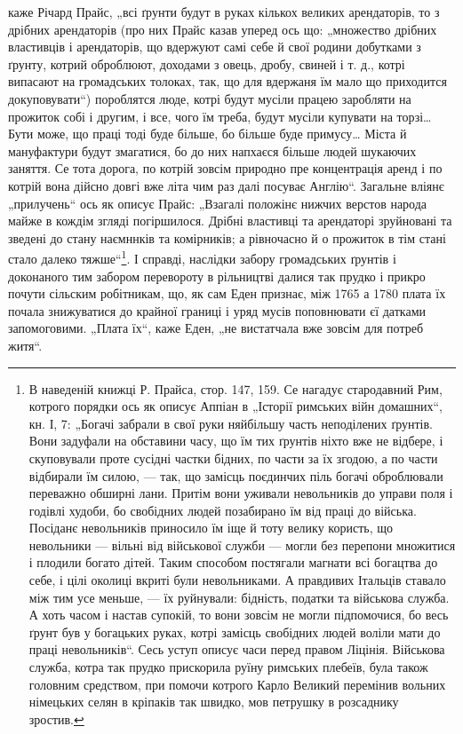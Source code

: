 \parcont{}
каже Річард Прайс, „всі ґрунти будут в руках кількох великих арендаторів, то з дрібних арендаторів (про них Прайс
казав уперед ось що: „множество дрібних властивців і арендаторів, що вдержуют самі себе й свої родини добутками з ґрунту, котрий оброблюют, доходами з овець, дробу, свиней і т. д.,
котрі випасают на громадських толоках, так, що для вдержаня їм мало що приходится докуповувати“)
пороблятся люде, котрі будут мусіли працею заробляти на прожиток собі і другим, і все, чого їм
треба, будут мусіли купувати на торзі\dots{} Бути може, що праці тоді буде більше, бо більше буде примусу\dots{} Міста й
мануфактури будут змагатися, бо до них напхаєся більше людей шукаючих заняття. Се тота дорога, по
котрій зовсім природно пре концентрація аренд і по котрій вона дійсно довгі вже літа чим раз далі
посуває Англію“. Загальне вліянє „прилучень“ ось як описує Прайс: „Взагалі положінє нижчих верстов
народа майже в кождім згляді погіршилося. Дрібні властивці та арендаторі зруйновані та зведені до
стану наємннків та комірників; а рівночасно й о прожиток в тім стані стало далеко тяжше“\footnote{
В наведеній книжці Р. Прайса, стор. 147, 159. Се нагадує стародавний Рим, котрого порядки ось як
описує Аппіан в „Історії римських війн домашних“, кн. І, 7: „Богачі забрали в свої руки няйбільшу
часть неподілених ґрунтів. Вони задуфали на обставини часу, що їм тих ґрунтів ніхто вже не відбере, і
скуповували проте сусідні частки бідних, по части за їх згодою, а по части відбирали їм силою, — так, що замісць
поєдинчих  піль богачі оброблювали переважно обширні лани. Притім
вони уживали невольників до управи поля і годівлі худоби, бо свобідних
людей позабирано їм від праці до війська. Посіданє невольників приносило їм іще й тоту велику
користь, що невольники — вільні від військової служби — могли без перепони множитися і плодили
богато дітей. Таким способом постягали магнати всі богацтва до себе, і цілі околиці вкриті були
невольниками. А правдивих Італьців ставало між тим усе меньше, — їх руйнували: бідність, податки та
військова служба. А хоть часом і настав супокій, то вони зовсім не могли підпомочися, бо весь ґрунт
був у богацьких руках, котрі замісць свобідних людей воліли мати до праці невольників“. Сесь уступ
описує часи перед правом Ліцінія. Військова служба, котра так прудко прискорила руїну римських
плебеїв, була також головним средством, при помочи котрого Карло Великий перемінив вольних німецьких
селян в кріпаків так швидко, мов петрушку в розсаднику зростив.
}. І справді, наслідки забору громадських ґрунтів і доконаного тим забором перевороту в рільництві далися
так прудко і прикро почути сільским робітникам, що, як сам Еден признає, між 1765 а 1780 плата їх
почала знижуватися до крайної границі і уряд мусів поповнювати єї датками запомоговими. „Плата їх“,
каже Еден, „не вистатчала вже зовсім для потреб житя“.
